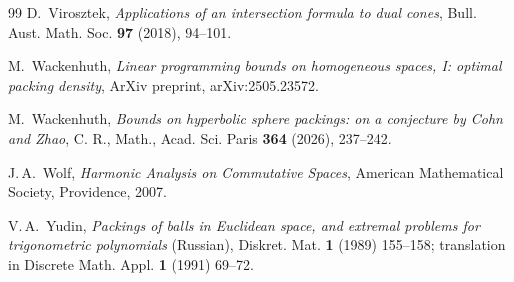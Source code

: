 \documentclass[[a4paper,english,12pt]{amsart}
\theoremstyle{plain}
\theoremstyle{remark}
\begin{document}
\begin{thebibliography}{99}
D.~Virosztek, \emph{Applications of an intersection formula to dual cones}, Bull. Aust. Math. Soc. \textbf{97} (2018), 94--101.

M.~Wackenhuth,
\emph{Linear programming bounds on homogeneous spaces, I: optimal packing density}, ArXiv preprint, arXiv:2505.23572.

M.~Wackenhuth,
\emph{Bounds on hyperbolic sphere packings: on a conjecture by Cohn and Zhao}, C. R., Math., Acad. Sci. Paris  
\textbf{364} (2026), 237--242.

J.\,A.~Wolf, \emph{Harmonic Analysis on Commutative Spaces}, American Mathematical Society, Providence, 2007.

V.\,A.~Yudin, \emph{Packings of balls in Euclidean space, and extremal problems for trigonometric polynomials} (Russian), 
Diskret. Mat. \textbf{1} (1989) 155--158; translation in Discrete Math. Appl. \textbf{1} (1991) 69--72.


\end{thebibliography}
\end{document}
